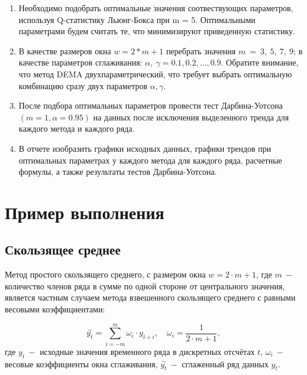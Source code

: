 \documentclass[
]{article}
\begin{document}
\begin{enumerate}
\def\labelenumi{\arabic{enumi}.}
\setcounter{enumi}{1}
\item
  Необходимо подобрать оптимальные значения соотвествующих параметров,
  используя Q-статистику Льюнг-Бокса при m = 5. Оптимальными параметрами
  будем считать те, что минимизируют приведенную статистику.
\item
  В качестве размеров окна \(w = 2 * m + 1\) перебрать значения
  \(m\ =\ 3,\ 5,\ 7,\ 9\); в качестве параметров сглаживания:
  \(\alpha,\ \gamma = 0.1, 0.2, \dots, 0.9\). Обратите внимание, что
  метод DEMA двухпараметрический, что требует выбрать оптимальную
  комбинацию сразу двух параметров \(\alpha, \gamma\).
\item
  После подбора оптимальных параметров провести тест Дарбина-Уотсона
  \((m = 1, \alpha = 0.95)\) на данных после исключения выделенного
  тренда для каждого метода и каждого ряда.
\item
  В отчете изобразить графики исходных данных, графики трендов при
  оптимальных параметрах у каждого метода для каждого ряда, расчетные
  формулы, а также результаты тестов Дарбина-Уотсона.
\end{enumerate}

\hypertarget{ux43fux440ux438ux43cux435ux440-ux432ux44bux43fux43eux43bux43dux435ux43dux438ux44f}{%
\section{\texorpdfstring{\textbf{Пример
выполнения}}{Пример выполнения}}\label{ux43fux440ux438ux43cux435ux440-ux432ux44bux43fux43eux43bux43dux435ux43dux438ux44f}}

\hypertarget{ux441ux43aux43eux43bux44cux437ux44fux449ux435ux435-ux441ux440ux435ux434ux43dux435ux435}{%
\subsection{\texorpdfstring{\textbf{Скользящее
среднее}}{Скользящее среднее}}\label{ux441ux43aux43eux43bux44cux437ux44fux449ux435ux435-ux441ux440ux435ux434ux43dux435ux435}}

Метод простого скользящего среднего, с размером окна
\(w = 2 \cdot m + 1\), где \(m\ -\) количество членов ряда в сумме по
одной стороне от центрального значения, является частным случаем метода
взвешенного скользящего среднего с равными весовыми коэффициентами:

\[
\overset{\sim}{y_t} = \sum\limits_{i = -m}^{m} \omega_i \cdot y_{t+i}, \quad \omega_i = \frac{1}{2 \cdot m + 1},
\] где \(y_t\ -\) исходные значения временного ряда в дискретных
отсчётах \(t\), \(\omega_i\ -\) весовые коэффициенты окна сглаживания,
\(\overset{\sim}{y_t}\ -\) сглаженный ряд данных \(y_t\).
\end{document}
